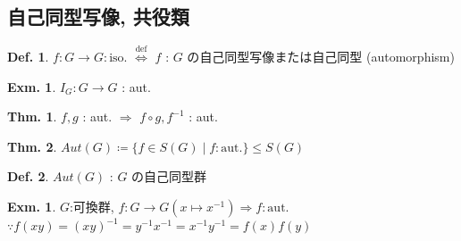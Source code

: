 \documentclass[uplatex,dvipdfmx,9pt]{beamer}
\newcommand{\defarrow}{\overset{\mathrm{def}}{\Leftrightarrow}}
\newcommand{\inverse}[1]{#1^{-1}}
\newcounter{textExmCount}
\theoremstyle{definition} %
\newtheorem{defn}{Def.}[subsection] %
\newtheorem{thm}{Thm.}[subsection] %
\theoremstyle{example}
\newtheorem{exm}{Exm.}[subsection]
\newtheorem{exmText}[textExmCount]{Exm.}
\begin{document}
    \subsection{\textsection \thesubsection 自己同型写像, 共役類}
    \setcounter{textExmCount}{0}

      \begin{frame}
        
        \begin{defn}
          $f\colon G \to G: \text{iso.}$ $\defarrow$ $f$ : $G$ の\alert{自己同型写像}または\alert{自己同型} (automorphism) 
        \end{defn}

        \begin{exm}
          $I_G\colon G \to G$ : aut.
        \end{exm}

        \begin{thm}
          $f, g$ : aut. $\Rightarrow$ $f \circ g, \inverse{f}$ : aut. 
        \end{thm}

        \begin{thm}
          $Aut(G) \coloneqq \{ f \in S(G) \mid f: \text{aut.} \} \le S(G)$
        \end{thm}

        \begin{defn}
          $Aut(G)$ : $G$ の\alert{自己同型群}
        \end{defn}

        \begin{exmText}
          $G$:可換群, $f\colon G \to G (x \mapsto \inverse{x}) \Rightarrow f: \text{aut.}$ \\
          $\because f(xy) = \inverse{(xy)} = \inverse{y}\inverse{x} = \inverse{x}\inverse{y} = f(x)f(y)$
        \end{exmText}
        
      \end{frame}
\end{document}
